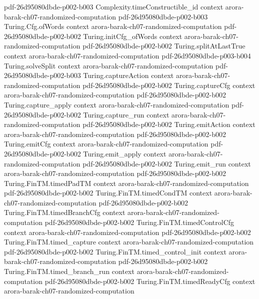 \begin{theorem}
  {pdf-26d95080dbde-p002-b003}
\proofstep
  {Complexity.timeConstructible_id}
  {context}
  {arora-barak-ch07-randomized-computation}
  {pdf-26d95080dbde-p002-b003}
\proofstep
  {Turing.Cfg.ofWords}
  {context}
  {arora-barak-ch07-randomized-computation}
  {pdf-26d95080dbde-p002-b002}
\proofstep
  {Turing.initCfg_ofWords}
  {context}
  {arora-barak-ch07-randomized-computation}
  {pdf-26d95080dbde-p002-b002}
\proofstep
  {Turing.splitAtLastTrue}
  {context}
  {arora-barak-ch07-randomized-computation}
  {pdf-26d95080dbde-p003-b004}
\proofstep
  {Turing.solveSplit}
  {context}
  {arora-barak-ch07-randomized-computation}
  {pdf-26d95080dbde-p002-b003}
\proofstep
  {Turing.captureAction}
  {context}
  {arora-barak-ch07-randomized-computation}
  {pdf-26d95080dbde-p002-b002}
\proofstep
  {Turing.captureCfg}
  {context}
  {arora-barak-ch07-randomized-computation}
  {pdf-26d95080dbde-p002-b002}
\proofstep
  {Turing.capture_apply}
  {context}
  {arora-barak-ch07-randomized-computation}
  {pdf-26d95080dbde-p002-b002}
\proofstep
  {Turing.capture_run}
  {context}
  {arora-barak-ch07-randomized-computation}
  {pdf-26d95080dbde-p002-b002}
\proofstep
  {Turing.emitAction}
  {context}
  {arora-barak-ch07-randomized-computation}
  {pdf-26d95080dbde-p002-b002}
\proofstep
  {Turing.emitCfg}
  {context}
  {arora-barak-ch07-randomized-computation}
  {pdf-26d95080dbde-p002-b002}
\proofstep
  {Turing.emit_apply}
  {context}
  {arora-barak-ch07-randomized-computation}
  {pdf-26d95080dbde-p002-b002}
\proofstep
  {Turing.emit_run}
  {context}
  {arora-barak-ch07-randomized-computation}
  {pdf-26d95080dbde-p002-b002}
\proofstep
  {Turing.FinTM.timedPadTM}
  {context}
  {arora-barak-ch07-randomized-computation}
  {pdf-26d95080dbde-p002-b002}
\proofstep
  {Turing.FinTM.timedCondTM}
  {context}
  {arora-barak-ch07-randomized-computation}
  {pdf-26d95080dbde-p002-b002}
\proofstep
  {Turing.FinTM.timedBranchCfg}
  {context}
  {arora-barak-ch07-randomized-computation}
  {pdf-26d95080dbde-p002-b002}
\proofstep
  {Turing.FinTM.timedControlCfg}
  {context}
  {arora-barak-ch07-randomized-computation}
  {pdf-26d95080dbde-p002-b002}
\proofstep
  {Turing.FinTM.timed_capture}
  {context}
  {arora-barak-ch07-randomized-computation}
  {pdf-26d95080dbde-p002-b002}
\proofstep
  {Turing.FinTM.timed_control_init}
  {context}
  {arora-barak-ch07-randomized-computation}
  {pdf-26d95080dbde-p002-b002}
\proofstep
  {Turing.FinTM.timed_branch_run}
  {context}
  {arora-barak-ch07-randomized-computation}
  {pdf-26d95080dbde-p002-b002}
\proofstep
  {Turing.FinTM.timedReadyCfg}
  {context}
  {arora-barak-ch07-randomized-computation}

\end{theorem}
